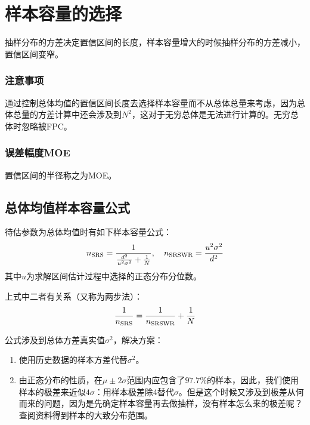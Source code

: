 \section{样本容量的选择}
抽样分布的方差决定置信区间的长度，样本容量增大的时候抽样分布的方差减小，置信区间变窄。
\subsubsection{注意事项}
通过控制总体均值的置信区间长度去选择样本容量而不从总体总量来考虑，因为总体总量的方差计算中还会涉及到$N^2$，这对于无穷总体是无法进行计算的。无穷总体时忽略被FPC。
\subsubsection{误差幅度MOE}
置信区间的半径称之为\gls{MOE}。

\subsection{总体均值样本容量公式}
\begin{theorem}
	待估参数为总体均值时有如下样本容量公式：
	\begin{equation}
		n_{\text{SRS}}=\frac{1}{\frac{d^2}{u^2\sigma^2}+\frac{1}{N}},\quad n_{\text{SRSWR}}=\frac{u^2\sigma^2}{d^2}\notag
	\end{equation}
	其中$u$为求解区间估计过程中选择的正态分布分位数。\par
	上式中二者有关系（又称为两步法）：
	\begin{equation}
		\frac{1}{n_{\text{SRS}}}=\frac{1}{n_{\text{SRSWR}}}+\frac{1}{N}\notag
	\end{equation}
\end{theorem}
公式涉及到总体方差真实值$\sigma^2$，解决方案：
\begin{enumerate}
	\item 使用历史数据的样本方差代替$\sigma^2$。
	\item 由正态分布的性质，在$\mu\pm2\sigma$范围内应包含了$97.7\%$的样本，因此，我们使用样本的极差来近似$4\sigma$：用样本极差除4替代$\sigma$。但是这个时候又涉及到极差从何而来的问题，因为是先确定样本容量再去做抽样，没有样本怎么来的极差呢？查阅资料得到样本的大致分布范围。
\end{enumerate}

